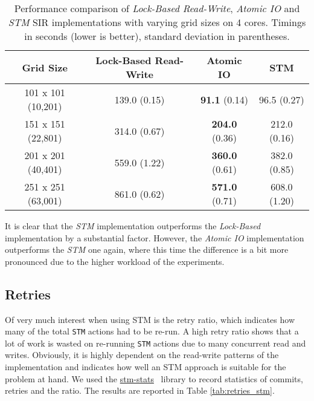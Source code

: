 \begin{table}
	\centering
  	\begin{tabular}{ c || c | c | c  }
        Grid Size           & Lock-Based Read-Write & Atomic IO              & STM            \\ \hline \hline 
   		101 x 101 (10,201)  & 139.0 (0.15)          & \textbf{91.1} (0.14)   & 96.5 (0.27)    \\ \hline
   		151 x 151 (22,801)  & 314.0 (0.67)          & \textbf{204.0} (0.36)  & 212.0 (0.16)   \\ \hline
   		201 x 201 (40,401)  & 559.0 (1.22)          & \textbf{360.0} (0.61)  & 382.0 (0.85)   \\ \hline
   		251 x 251 (63,001)  & 861.0 (0.62)          & \textbf{571.0} (0.71)  & 608.0 (1.20)   \\ \hline \hline
  	\end{tabular}

  	\caption{Performance comparison of \textit{Lock-Based Read-Write}, \textit{Atomic IO} and \textit{STM} SIR implementations with varying grid sizes on 4 cores. Timings in seconds (lower is better), standard deviation in parentheses.}
	\label{tab:sir_varyinggrid_constcores} 
\end{table}

It is clear that the \textit{STM} implementation outperforms the \textit{Lock-Based} implementation by a substantial factor. However, the \textit{Atomic IO} implementation outperforms the \textit{STM} one again, where this time the difference is a bit more pronounced due to the higher workload of the experiments.

\subsection{Retries}
Of very much interest when using STM is the retry ratio, which indicates how many of the total \texttt{STM} actions had to be re-run. A high retry ratio shows that a lot of work is wasted on re-running \texttt{STM} actions due to many concurrent read and writes. Obviously, it is highly dependent on the read-write patterns of the implementation and indicates how well an STM approach is suitable for the problem at hand. We used the \href{http://hackage.haskell.org/package/stm-stats}{stm-stats}~\cite{stm_stats_library} library to record statistics of commits, retries and the ratio. The results are reported in Table \ref{tab:retries_stm}.

